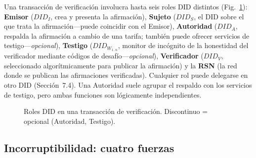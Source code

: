 \documentclass[11pt,a4paper,twocolumn]{article}
\begin{document}
Una transacción de verificación involucra hasta seis roles DID distintos (Fig.~\ref{fig:roles}): \textbf{Emisor} ($DID_I$, crea y presenta la afirmación), \textbf{Sujeto} ($DID_S$, el DID sobre el que trata la afirmación---puede coincidir con el Emisor), \textbf{Autoridad} ($DID_A$, respalda la afirmación a cambio de una tarifa; también puede ofrecer servicios de testigo---\emph{opcional}), \textbf{Testigo} ($DID_{W_{1..n}}$, monitor de incógnito de la honestidad del verificador mediante códigos de desafío---\emph{opcional}), \textbf{Verificador} ($DID_V$, seleccionado algorítmicamente para publicar la afirmación) y la \textbf{RSN} (la red donde se publican las afirmaciones verificadas). Cualquier rol puede delegarse en otro DID (Sección~7.4). Una Autoridad suele agrupar el respaldo con los servicios de testigo, pero ambas funciones son lógicamente independientes.

\begin{figure}[ht]
\centering
{}
\caption{Roles DID en una transacción de verificación. Discontinuo = opcional (Autoridad, Testigo).}
\label{fig:roles}
\end{figure}

\subsection{Incorruptibilidad: cuatro fuerzas}
\end{document}
